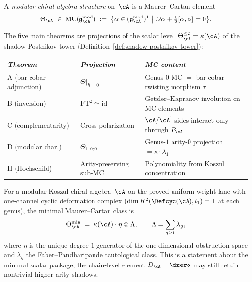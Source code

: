 \begin{definition}
\label{def:modular-chiral-structure-mc}
A \emph{modular chiral algebra structure} on~$\cA$ is a
Maurer--Cartan element
\begin{equation}\label{eq:modular-mc-element}
\Theta_{\cA}
\;\in\;
\operatorname{MC}(\mathfrak{g}_{\cA}^{\mathrm{mod}})
\;:=\;
\bigl\{
\alpha \in (\mathfrak{g}_{\cA}^{\mathrm{mod}})^1
\;\big|\;
D\alpha + \tfrac12[\alpha,\alpha] = 0
\bigr\}.
\end{equation}
\end{definition}

\begin{remark}
\label{rem:five-from-one}
The five main theorems are projections of the scalar
level~$\Theta_{\cA}^{\leq 2} = \kappa(\cA)$ of the
shadow Postnikov tower
(Definition~\ref{def:shadow-postnikov-tower}):
\begin{center}
\small
\renewcommand{\arraystretch}{1.2}
\begin{tabular}{lll}
\toprule
\emph{Theorem} & \emph{Projection} & \emph{MC content} \\
\midrule
A (bar-cobar adjunction) &
  $\Theta|_{\hbar=0}$ &
  Genus-$0$ MC $= $ bar-cobar twisting morphism $\tau$ \\
B (inversion) &
  $\mathrm{FT}^2 \simeq \mathrm{id}$ &
  Getzler--Kapranov involution on MC elements \\
C (complementarity) &
  Cross-polarization &
  $\cA/\cA^!$-sides interact only through $P_{\cA}$ \\
D (modular char.) &
  $\Theta_{1,0;0}$ &
  Genus-$1$ arity-$0$ projection $= \kappa \cdot \lambda_1$ \\
H (Hochschild) &
  Arity-preserving sub-MC &
  Polynomiality from Koszul concentration \\
\bottomrule
\end{tabular}
\end{center}
\end{remark}

\begin{theorem}
\label{thm:theta-direct-derivation}
For a modular Koszul chiral algebra~$\cA$ on the proved
uniform-weight lane with one-channel cyclic deformation complex
\textup{(}$\dim H^2(\Defcyc(\cA), l_1) = 1$ at each genus\textup{)},
the minimal Maurer--Cartan class is
\begin{equation}\label{eq:theta-explicit-direct}
\Theta_{\cA}^{\min}
\;=\;
\kappa(\cA) \cdot \eta \otimes \Lambda,
\qquad
\Lambda = \sum_{g \geq 1} \lambda_g,
\end{equation}
where $\eta$ is the unique degree-$1$ generator of the
one-dimensional obstruction space and $\lambda_g$ the
Faber--Pandharipande tautological class.  This is a statement
about the minimal scalar package; the chain-level
element $D_\cA-\dzero$ may still retain nontrivial higher-arity
shadows.
\end{theorem}

